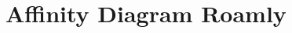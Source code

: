 \documentclass[11pt,a4paper]{article}
\begin{document}
\section*{Affinity Diagram Roamly}

\end{document}
